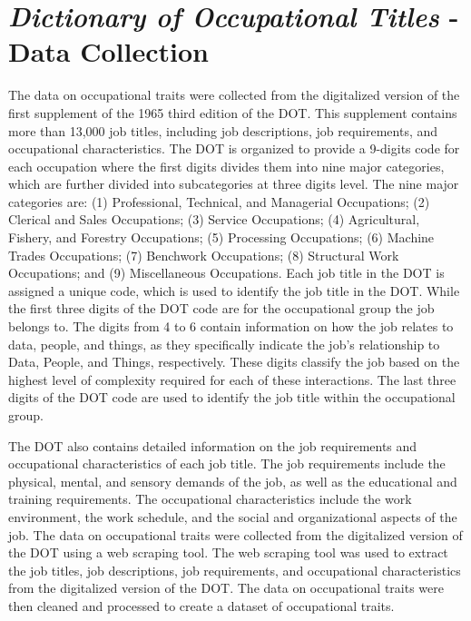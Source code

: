 \documentclass[11pt, a4paper, leqno]{article}
\begin{document}
\section{\textit{Dictionary of Occupational Titles} - Data Collection}
The data on occupational traits were collected from the digitalized version of the first supplement of the 1965 third edition of the DOT. This supplement contains more than 13,000 job titles, including job descriptions, job requirements, and occupational characteristics. The DOT is organized to provide a 9-digits code for each occupation where the first digits divides them into nine major categories, which are further divided into subcategories at three digits level. The nine major categories are: (1) Professional, Technical, and Managerial Occupations; (2) Clerical and Sales Occupations; (3) Service Occupations; (4) Agricultural, Fishery, and Forestry Occupations; (5) Processing Occupations; (6) Machine Trades Occupations; (7) Benchwork Occupations; (8) Structural Work Occupations; and (9) Miscellaneous Occupations. Each job title in the DOT is assigned a unique code, which is used to identify the job title in the DOT. While the first three digits of the DOT code are for the  occupational group the job belongs to. The digits from 4 to 6 contain information on how the job relates to data, people, and things, as they specifically indicate the job’s relationship to Data, People, and Things, respectively. These digits classify the job based on the highest level of complexity required for each of these interactions. The last three digits of the DOT code are used to identify the job title within the occupational group.

The DOT also contains detailed information on the job requirements and occupational characteristics of each job title. The job requirements include the physical, mental, and sensory demands of the job, as well as the educational and training requirements. The occupational characteristics include the work environment, the work schedule, and the social and organizational aspects of the job. The data on occupational traits were collected from the digitalized version of the DOT using a web scraping tool. The web scraping tool was used to extract the job titles, job descriptions, job requirements, and occupational characteristics from the digitalized version of the DOT. The data on occupational traits were then cleaned and processed to create a dataset of occupational traits.













\newpage
\nocite{*}
\printbibliography
\end{document}
